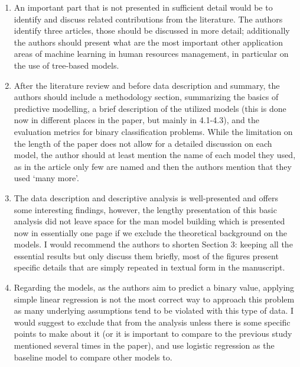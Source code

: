 \documentclass{amsart}[12pt]
\begin{document}
\begin{enumerate}
    \item   {\color{blue} 
        An important part that is not presented in sufficient detail would be to identify and discuss related contributions from the literature. The authors identify three articles, those should be discussed in more detail; additionally the authors should present what are the most important other application areas of machine learning in human resources management, in particular on the use of tree-based models. 
        }\\

    \item   {\color{blue} 
        After the literature review and before data description and summary, the authors should include a methodology section, summarizing the basics of predictive modelling, a brief description of the utilized models (this is done now in different places in the paper, but mainly in 4.1-4.3), and the evaluation metrics for binary classification problems. While the limitation on the length of the paper does not allow for a detailed discussion on each model, the author should at least mention the name of each model they used, as in the article only few are named and then the authors mention that they used ‘many more’.
        }\\

    \item   {\color{blue} 
        The data description and descriptive analysis is well-presented and offers some interesting findings, however, the lengthy presentation of this basic analysis did not leave space for the man model building which is presented now in essentially one page if we exclude the theoretical background on the models. I would recommend the authors to shorten Section 3: keeping all the essential results but only discuss them briefly, most of the figures present specific details that are simply repeated in textual form in the manuscript.
        }\\
        
    \item   {\color{blue} 
        Regarding the models, as the authors aim to predict a binary value, applying simple linear regression is not the most correct way to approach this problem as many underlying assumptions tend to be violated with this type of data. I would suggest to exclude that from the analysis unless there is some specific points to make about it (or it is important to compare to the previous study mentioned several times in the paper), and use logistic regression as the baseline model to compare other models to. 
        }\\
        

\end{enumerate}
\end{document}
